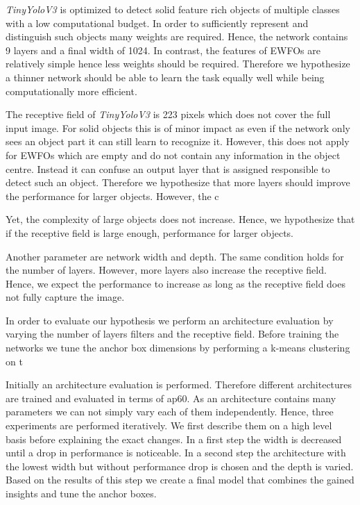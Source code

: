 \textit{TinyYoloV3} is optimized to detect solid feature rich objects of multiple classes with a low computational budget. In order to sufficiently represent and distinguish such objects many weights are required. Hence, the network contains 9 layers and a final width of 1024. In contrast, the features of \acp{EWFO} are relatively simple hence less weights should be required. Therefore we hypothesize a thinner network should be able to learn the task equally well while being computationally more efficient.

The receptive field of \textit{TinyYoloV3} is 223 pixels which does not cover the full input image. For solid objects this is of minor impact as even if the network only sees an object part it can still learn to recognize it. However, this does not apply for \acp{EWFO} which are empty and do not contain any information in the object centre. Instead it can confuse an output layer that is assigned responsible to detect such an object. Therefore we hypothesize that more layers should improve the performance for larger objects. However, the c 

Yet, the complexity of large objects does not increase. Hence, we hypothesize that if the receptive field is large enough,  performance for larger objects. 

Another parameter are network width and depth.  The same condition holds for the number of layers. However, more layers also increase the receptive field. Hence, we expect the performance to increase as long as the receptive field does not fully capture the image.

In order to evaluate our hypothesis we perform an architecture evaluation by varying the number of layers filters and the receptive field. Before training the networks we tune the anchor box dimensions by performing a k-means clustering on t

Initially an architecture evaluation is performed. Therefore different architectures are trained and evaluated in terms of \ac{ap60}. As an architecture contains many parameters we can not simply vary each of them independently. Hence, three experiments are performed iteratively. We first describe them on a high level basis before explaining the exact changes. In a first step the width is decreased until a drop in performance is noticeable. In a second step the architecture with the lowest width but without performance drop is chosen and the depth is varied. Based on the results of this step we create a final model that combines the gained insights and tune the anchor boxes.

